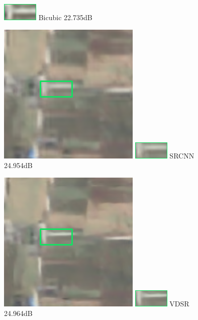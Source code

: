 \documentclass[runningheads,a4paper]{llncs}
\begin{document}
\begin{figure}[htbp]
\begin{minipage}{1.4cm}
    \includegraphics[scale=0.8]{pic/8x/bicu/small-437.png}
    {Bicubic \newline 22.735dB }
    \end{minipage}
    \qquad
    \begin{minipage}{1.5cm}
     \includegraphics[scale=0.2]{pic/8x/srcnn/pick-437.png}
    \includegraphics[scale=0.8]{pic/8x/srcnn/small-437.png}
    {SRCNN \newline 24.954dB }
    \end{minipage}
    \qquad
    \begin{minipage}{1.4cm}
     \includegraphics[scale=0.2]{pic/8x/vdsr/pick-437.png}
    \includegraphics[scale=0.8]{pic/8x/vdsr/small-437.png}
    {VDSR \newline 24.964dB}

\end{minipage}
\end{figure}
\end{document}
